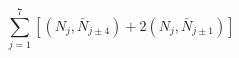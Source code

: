 \begin{equation}
\sum_{j=1}^{7} [(N_j, \bar{N}_{j\pm4}) + 2 (N_j, \bar{N}_{j\pm1})]
\end{equation}

